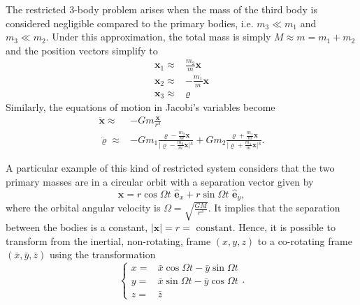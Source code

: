 The restricted 3-body problem arises when the mass of the third body is considered negligible compared to the primary bodies, i.e. $m_3 \ll m_1$ and $m_3 \ll m_2$. Under this approximation, the total mass is simply $M \approx m = m_1 + m_2$ and the position vectors simplify to 
\begin{subequations}
    \begin{align}
        \textbf{x}_1 \approx &\frac{m_2}{m}\textbf{x}\\
        \textbf{x}_2 \approx &-\frac{m_1}{m}\textbf{x}\\
        \textbf{x}_3 \approx &\boldsymbol{\varrho}
    \end{align}
\end{subequations}
Similarly, the equations of motion in Jacobi's variables become
\begin{subequations}
    \begin{align}
        \ddot{\textbf{x}} \approx & -Gm\frac{\textbf{x}}{r^3}\\
        \ddot{\boldsymbol{\varrho}} \approx &- G m_1 \frac{\boldsymbol{\varrho} - \frac{m_2}{m}\textbf{x}}{\vert{} \boldsymbol{\varrho} - \frac{m_2}{m}\textbf{x}\vert{}^3} + Gm_2 \frac{\boldsymbol{\varrho} + \frac{m_1}{m}\textbf{x}}{\vert{} \boldsymbol{\varrho} + \frac{m_1}{m}\textbf{x}\vert{}^3} .
    \end{align} \label{eq:EoM3BodiesRestricted}
\end{subequations}

A particular example of this kind of restricted system considers that the two primary masses are in a circular orbit with a separation vector given by
\begin{equation}
    \textbf{x} = r \cos \Omega t \,\, \hat{\textbf{e}}_x + r \sin \Omega t \,\, \hat{\textbf{e}}_y,
\end{equation}
where the orbital angular velocity is $\Omega = \sqrt{\frac{GM}{r^3}}$. It implies that the separation between the bodies is a constant, $\vert{} \textbf{x} \vert{} = r = \text{ constant}$. Hence, it is possible to transform from the inertial, non-rotating, frame $(x,y,z)$ to a co-rotating frame $(\bar{x},\bar{y},\bar{z})$ using the transformation
\begin{equation}
    \begin{cases}
        x = & \bar{x} \cos \Omega t - \bar{y} \sin \Omega t\\
        y = & \bar{x} \sin \Omega t - \bar{y} \cos \Omega t\\
        z = & \bar{z} 
    \end{cases}.
\end{equation}

